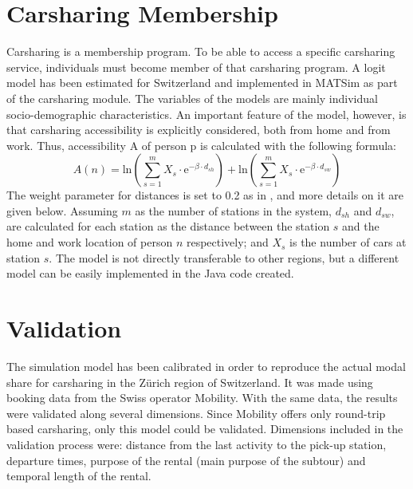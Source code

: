 \section{Carsharing Membership}
Carsharing is a membership program.  To be able to access a specific carsharing service, individuals must become member of that carsharing program. A logit model has been estimated for Switzerland \citep[][]{CiariWeis_EURO_2014} and implemented in MATSim as part of the carsharing module. The variables of the models are mainly individual socio-demographic characteristics.  
An important feature of the model, however, is that carsharing accessibility is explicitly considered, both from home and from work. Thus, accessibility A of person p is calculated with the following formula:
%
\begin{equation}
A(n) = \mathrm{ln} \left(\sum_{s=1}^m X_s \cdot \mathrm{e}^{-\beta \cdot d_{sh}}\right) + \mathrm{ln} \left(\sum_{s=1}^{m} X_s \cdot \mathrm{e}^{-\beta \cdot d_{sw}}\right)
\end{equation}
%
The weight parameter for distances is set to 0.2 as in \citet[][]{Weis_PhDThesis_2012} , and more details on it are given below. Assuming $m$ as the number of stations in the system, $d_{sh}$ and $d_{sw}$, are calculated for each station as the distance between the station $s$ and the home and work location of person $n$ respectively; and $X_s$ is the number of cars at station $s$. 
The model is not directly transferable to other regions, but a different model can be easily implemented in the Java code created. 

\section{Validation}
The simulation model has been calibrated in order to reproduce the actual modal share for carsharing in the Zürich region of Switzerland. It was made using booking data from the Swiss operator Mobility. With the same data, the results were validated along several dimensions. Since Mobility  offers only round-trip based carsharing, only  this model could be validated. Dimensions included in the validation process were: distance from the last activity to the pick-up station, departure times, purpose of the rental (main purpose of the subtour) and temporal length of the rental. 


